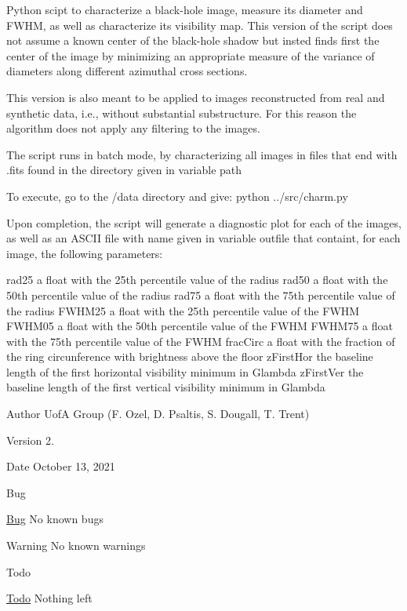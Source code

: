 Python scipt to characterize a black-\/hole image, measure its diameter and F\+W\+HM, as well as characterize its visibility map. This version of the script does not assume a known center of the black-\/hole shadow but insted finds first the center of the image by minimizing an appropriate measure of the variance of diameters along different azimuthal cross sections.

This version is also meant to be applied to images reconstructed from real and synthetic data, i.\+e., without substantial substructure. For this reason the algorithm does not apply any filtering to the images.

The script runs in batch mode, by characterizing all images in files that end with \textquotesingle{}.fits\textquotesingle{} found in the directory given in variable \textquotesingle{}path\textquotesingle{}

To execute, go to the /data directory and give\+: python ../src/charm.py

Upon completion, the script will generate a diagnostic plot for each of the images, as well as an A\+S\+C\+II file with name given in variable \textquotesingle{}outfile\textquotesingle{} that containt, for each image, the following parameters\+: \begin{DoxyVerb}rad25 a float with the 25th percentile value of the radius
rad50 a float with the 50th percentile value of the radius
rad75 a float with the 75th percentile value of the radius
FWHM25 a float with the 25th percentile value of the FWHM
FWHM05 a float with the 50th percentile value of the FWHM
FWHM75 a float with the 75th percentile value of the FWHM
fracCirc a float with the fraction of the ring circunference with brightness above the floor
zFirstHor the baseline length of the first horizontal visibility minimum in Glambda
zFirstVer the baseline length of the first vertical visibility minimum in Glambda
\end{DoxyVerb}
 \begin{DoxyAuthor}{Author}
UofA Group (F. Ozel, D. Psaltis, S. Dougall, T. Trent)
\end{DoxyAuthor}
\begin{DoxyVersion}{Version}
2.
\end{DoxyVersion}
\begin{DoxyDate}{Date}
October 13, 2021
\end{DoxyDate}
\begin{DoxyRefDesc}{Bug}
\item[\mbox{\hyperlink{bug__bug000002}{Bug}}]No known bugs\end{DoxyRefDesc}


\begin{DoxyWarning}{Warning}
No known warnings
\end{DoxyWarning}
\begin{DoxyRefDesc}{Todo}
\item[\mbox{\hyperlink{todo__todo000002}{Todo}}]Nothing left \end{DoxyRefDesc}
